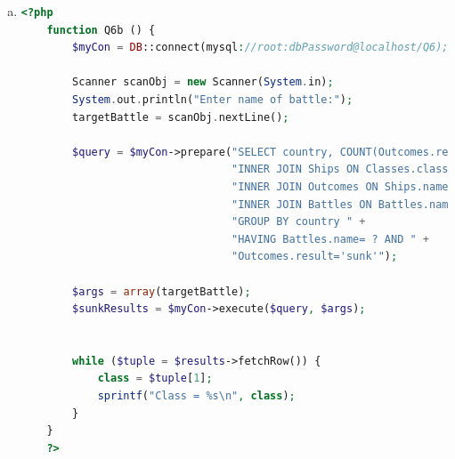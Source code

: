\documentclass[12pt]{article}
\begin{document}
\begin{enumerate}[1.]
\begin{enumerate}[a)]
        \item

    \begin{lstlisting}[language=PHP]
    <?php
    function Q6b () {
        $myCon = DB::connect(mysql://root:dbPassword@localhost/Q6);

        Scanner scanObj = new Scanner(System.in);
        System.out.println("Enter name of battle:");
        targetBattle = scanObj.nextLine();

        $query = $myCon->prepare("SELECT country, COUNT(Outcomes.result) FROM Classes " +
                                 "INNER JOIN Ships ON Classes.class = Ships.class " +
                                 "INNER JOIN Outcomes ON Ships.name = Outcomes.ship " +
                                 "INNER JOIN Battles ON Battles.name = Outcome.battle " +
                                 "GROUP BY country " +
                                 "HAVING Battles.name= ? AND " +
                                 "Outcomes.result='sunk'");

        $args = array(targetBattle);
        $sunkResults = $myCon->execute($query, $args);


        while ($tuple = $results->fetchRow()) {
            class = $tuple[1];
            sprintf("Class = %s\n", class);
        }
    }
    ?>
    \end{lstlisting}
    \end{enumerate}

\end{enumerate}
\end{document}
